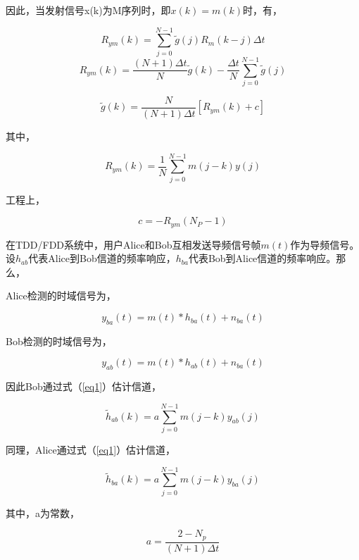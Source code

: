 \documentclass[master]{seuthesis} %
\begin{document}
\begin{Main}
因此，当发射信号x(k)为M序列时，即$x(k) = m(k)$时，有，

\begin{equation}
    R_{ym}(k) = \sum_{j=0}^{N-1} \tilde{g}(j)R_m(k-j)\Delta t
\end{equation}
\begin{equation}
    R_{ym}(k) = \frac{(N+1)\Delta t}{N} \tilde{g}(k) - \frac{\Delta t}{N} \sum_{j=0}^{N-1} \tilde{g}(j)
\end{equation}
  
\begin{equation}\label{eq1}
    \tilde{g}(k) = \frac{N}{(N+1)\Delta t} [R_{ym}(k) + c]
\end{equation}

其中，

\begin{equation}
  R_{ym}(k) = \frac{1}{N}\sum_{j=0}^{N-1}m(j-k)y(j)
\end{equation}

工程上，

\begin{equation}
  c=-R_{ym}(N_P - 1)
\end{equation}
  
在TDD/FDD系统中，用户Alice和Bob互相发送导频信号帧$m(t)$作为导频信号。设$h_{ab}$代表Alice到Bob信道的频率响应，$h_{ba}$代表Bob到Alice信道的频率响应。那么，

Alice检测的时域信号为，

\begin{equation}
    y_{ba}(t) = m(t) * h_{ba}(t) + n_{ba}(t) 
\end{equation}

Bob检测的时域信号为，

\begin{equation}
    y_{ab}(t) = m(t) * h_{ab}(t) + n_{ba}(t)    
\end{equation}

因此Bob通过式（\ref{eq1}）估计信道，

\begin{equation}
    \tilde{h}_{ab}(k) = a\sum_{j=0}^{N-1}m(j-k)y_{ab}(j)
\end{equation}
  
同理，Alice通过式（\ref{eq1}）估计信道，
  
\begin{equation}
    \tilde{h}_{ba}(k) = a\sum_{j=0}^{N-1}m(j-k)y_{ba}(j)
\end{equation}
  
其中，a为常数，

\begin{equation}
    a = \frac{2-N_p}{(N + 1)\Delta t}
\end{equation}


\end{Main}
\end{document}
